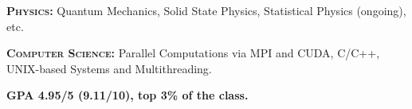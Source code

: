 \begin{cventries}
{\begin{cvitems}
        \item {\textsc{\textbf{Physics:}} \hspace{5pt} Quantum Mechanics, \hspace{10pt} Solid State Physics, \hspace{10pt} Statistical Physics (ongoing), \hspace{10pt} etc.}
        \item {\textsc{\textbf{Computer Science:}}\hspace{5pt} Parallel Computations via \textsf{MPI and CUDA}, \hspace{5pt}  C/C++, \hspace{5pt} UNIX-based Systems and Multithreading.}
		\item {\textbf{GPA 4.95/5 (9.11/10), top 3\% of the class.}}        
      \end{cvitems}
    }

\end{cventries}

